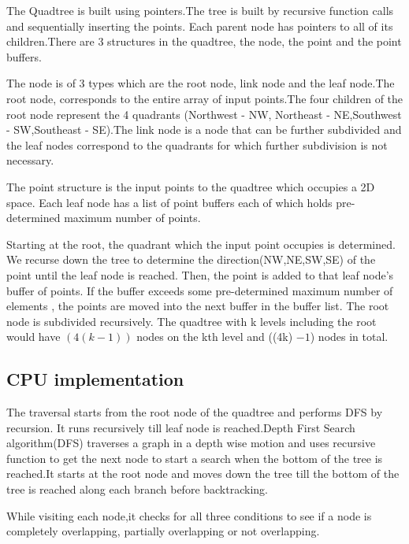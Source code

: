 \documentclass{article}
\begin{document}
The Quadtree is built using pointers.The tree is built by recursive function calls and sequentially inserting the points. Each parent node has pointers to all of its children.There are 3 structures in the quadtree, the node, the point and the point buffers. 

The node is of 3 types which are the root node, link node and the leaf node.The root node,  corresponds to the entire array of input points.The four children of the root node represent the 4 quadrants (Northwest - NW, Northeast - NE,Southwest - SW,Southeast - SE).The link node is a node that can be further subdivided and the leaf nodes correspond to the quadrants for which further subdivision is not necessary. 

The point structure is the input points to the quadtree which occupies a 2D space. Each leaf node has a list of point buffers each of which holds pre-determined maximum number of points.

Starting at the root, the quadrant which the input point occupies is determined. We recurse down the tree to determine the direction(NW,NE,SW,SE) of the point until the leaf node is reached. 
Then,  the point is added to that leaf node's buffer of points. If the buffer exceeds some pre-determined maximum number of elements , the points are moved into the next buffer in the buffer list. 
The root node is subdivided recursively. The quadtree with k levels including the root would have ${(4(k-1))}$ nodes on the kth level and  ((4k) $-1$) nodes in total.


\subsection{CPU implementation}

The traversal starts from the root node of the quadtree and performs DFS by recursion.
It runs recursively till leaf node is reached.Depth First Search algorithm(DFS) traverses a graph in a depth wise motion and uses recursive function to get the next node to start a search when the bottom of the tree is reached.It starts at the root node and moves down the tree till the bottom of the tree is reached along each branch before backtracking.

While visiting each node,it checks for all three conditions to see if a node is completely overlapping, partially overlapping or not overlapping.
\end{document}
